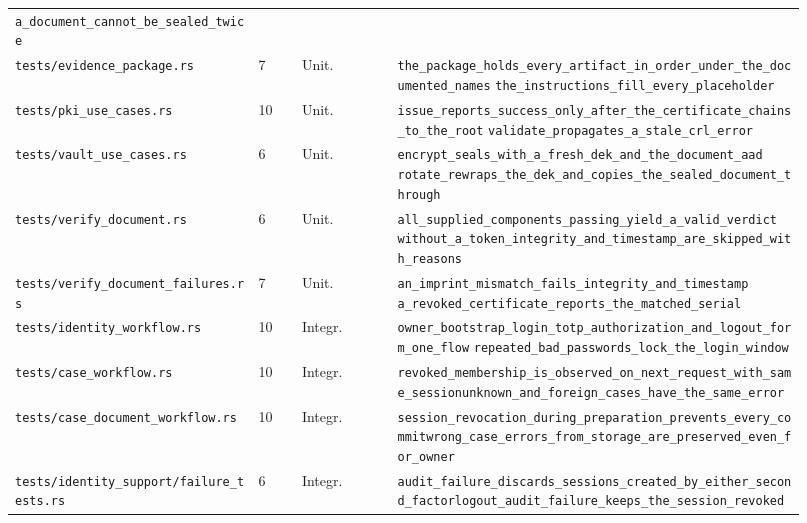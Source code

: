 \begin{longtable}{@{}L{0.285\linewidth}C{0.05\linewidth}L{0.115\linewidth}L{0.47\linewidth}@{}}
    \texttt{a\_document\_cannot\_be\_sealed\_twice} \\
  \texttt{tests/evidence\_package.rs} & 7 & Unit. & \texttt{the\_package\_holds\_every\_artifact\_in\_order\_under\_the\_documented\_names}\newline
    \texttt{the\_instructions\_fill\_every\_placeholder} \\
  \texttt{tests/pki\_use\_cases.rs} & 10 & Unit. & \texttt{issue\_reports\_success\_only\_after\_the\_certificate\_chains\_to\_the\_root}\newline
    \texttt{validate\_propagates\_a\_stale\_crl\_error} \\
  \texttt{tests/vault\_use\_cases.rs} & 6 & Unit. & \texttt{encrypt\_seals\_with\_a\_fresh\_dek\_and\_the\_document\_aad}\newline
    \texttt{rotate\_rewraps\_the\_dek\_and\_copies\_the\_sealed\_document\_through} \\
  \texttt{tests/verify\_document.rs} & 6 & Unit. & \texttt{all\_supplied\_components\_passing\_yield\_a\_valid\_verdict}\newline
    \texttt{without\_a\_token\_integrity\_and\_timestamp\_are\_skipped\_with\_reasons} \\
  \texttt{tests/verify\_document\_failures.rs} & 7 & Unit. & \texttt{an\_imprint\_mismatch\_fails\_integrity\_and\_timestamp}\newline
    \texttt{a\_revoked\_certificate\_reports\_the\_matched\_serial} \\
  \texttt{tests/identity\_workflow.rs} & 10 & Integr. & \texttt{owner\_bootstrap\_login\_totp\_authorization\_and\_logout\_form\_one\_flow}\newline
    \texttt{repeated\_bad\_passwords\_lock\_the\_login\_window} \\
  \texttt{tests/\allowbreak{}case\_workflow.rs} & 10 & Integr. & \texttt{revoked\_membership\_is\_observed\_on\_next\_request\_with\_same\_session}\newline\texttt{unknown\_and\_foreign\_cases\_have\_the\_same\_error} \\
  \texttt{tests/\allowbreak{}case\_document\_workflow.rs} & 10 & Integr. & \texttt{session\_revocation\_during\_preparation\_prevents\_every\_commit}\newline\texttt{wrong\_case\_errors\_from\_storage\_are\_preserved\_even\_for\_owner} \\
  \texttt{tests/\allowbreak{}identity\_support/\allowbreak{}failure\_tests.rs} & 6 & Integr. & \texttt{audit\_failure\_discards\_sessions\_created\_by\_either\_second\_factor}\newline\texttt{logout\_audit\_failure\_keeps\_the\_session\_revoked} \\

\end{longtable}
